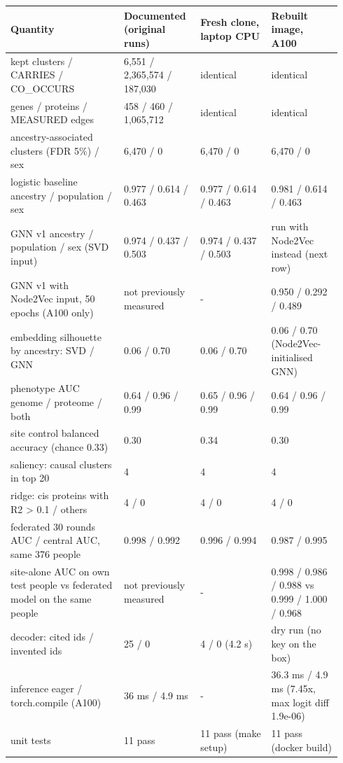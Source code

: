 \documentclass[11pt,a4paper]{article}
\begin{document}
\begin{longtable}{p{0.320\linewidth}p{0.207\linewidth}p{0.207\linewidth}p{0.207\linewidth}}
\toprule
\textbf{Quantity} & \textbf{Documented (original runs)} & \textbf{Fresh clone, laptop CPU} & \textbf{Rebuilt image, A100} \\
\midrule
\endhead
kept clusters / CARRIES / CO\_OCCURS & 6,551 / 2,365,574 / 187,030 & identical & identical \\
genes / proteins / MEASURED edges & 458 / 460 / 1,065,712 & identical & identical \\
ancestry-associated clusters (FDR 5\%) / sex & 6,470 / 0 & 6,470 / 0 & 6,470 / 0 \\
logistic baseline ancestry / population / sex & 0.977 / 0.614 / 0.463 & 0.977 / 0.614 / 0.463 & 0.981 / 0.614 / 0.463 \\
GNN v1 ancestry / population / sex (SVD input) & 0.974 / 0.437 / 0.503 & 0.974 / 0.437 / 0.503 & run with Node2Vec instead (next row) \\
GNN v1 with Node2Vec input, 50 epochs (A100 only) & not previously measured & - & 0.950 / 0.292 / 0.489 \\
embedding silhouette by ancestry: SVD / GNN & 0.06 / 0.70 & 0.06 / 0.70 & 0.06 / 0.70 (Node2Vec-initialised GNN) \\
phenotype AUC genome / proteome / both & 0.64 / 0.96 / 0.99 & 0.65 / 0.96 / 0.99 & 0.64 / 0.96 / 0.99 \\
site control balanced accuracy (chance 0.33) & 0.30 & 0.34 & 0.30 \\
saliency: causal clusters in top 20 & 4 & 4 & 4 \\
ridge: cis proteins with R2 > 0.1 / others & 4 / 0 & 4 / 0 & 4 / 0 \\
federated 30 rounds AUC / central AUC, same 376 people & 0.998 / 0.992 & 0.996 / 0.994 & 0.987 / 0.995 \\
site-alone AUC on own test people vs federated model on the same people & not previously measured & - & 0.998 / 0.986 / 0.988 vs 0.999 / 1.000 / 0.968 \\
decoder: cited ids / invented ids & 25 / 0 & 4 / 0 (4.2 s) & dry run (no key on the box) \\
inference eager / torch.compile (A100) & 36 ms / 4.9 ms & - & 36.3 ms / 4.9 ms (7.45x, max logit diff 1.9e-06) \\
unit tests & 11 pass & 11 pass (make setup) & 11 pass (docker build) \\
\bottomrule
\end{longtable}
\end{document}
